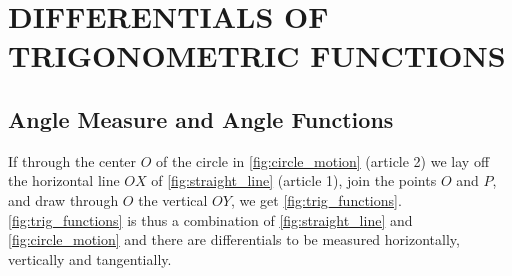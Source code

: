 \chapter{DIFFERENTIALS OF TRIGONOMETRIC FUNCTIONS}
\setcounter{section}{22}

\section{Angle Measure and Angle Functions}

If through the center $O$ of the circle in \autoref{fig:circle_motion} (article 2) we lay off the horizontal line $OX$ of \autoref{fig:straight_line} (article 1), join the points $O$ and $P$, and draw through $O$ the vertical $OY$, we get \autoref{fig:trig_functions}. \autoref{fig:trig_functions} is thus a combination of \autoref{fig:straight_line} and \autoref{fig:circle_motion} and there are differentials to be measured horizontally, vertically and tangentially.

